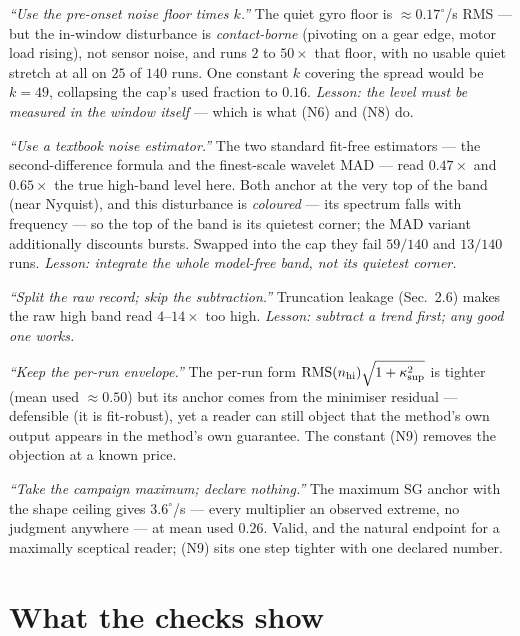 \documentclass[10pt]{article}
\newcommand{\rms}{\mathrm{RMS}}
\begin{document}
\emph{``Use the pre-onset noise floor times $k$.''} The quiet gyro
floor is $\approx 0.17^\circ$/s RMS --- but the in-window disturbance
is \emph{contact-borne} (pivoting on a gear edge, motor load rising),
not sensor noise, and runs $2$ to $50\times$ that floor, with no
usable quiet stretch at all on $25$ of $140$ runs. One constant $k$
covering the spread would be $k = 49$, collapsing the cap's used
fraction to $0.16$. \emph{Lesson: the level must be measured in the
window itself} --- which is what (N6) and (N8) do.

\emph{``Use a textbook noise estimator.''} The two standard fit-free
estimators --- the second-difference formula and the finest-scale
wavelet MAD --- read $0.47\times$ and $0.65\times$ the true high-band
level here. Both anchor at the very top of the band (near Nyquist),
and this disturbance is \emph{coloured} --- its spectrum falls with
frequency --- so the top of the band is its quietest corner; the MAD
variant additionally discounts bursts. Swapped into the cap they fail
$59/140$ and $13/140$ runs. \emph{Lesson: integrate the whole
model-free band, not its quietest corner.}

\emph{``Split the raw record; skip the subtraction.''} Truncation
leakage (Sec.~2.6) makes the raw high band read $4$--$14\times$ too
high. \emph{Lesson: subtract a trend first; any good one works.}

\emph{``Keep the per-run envelope.''} The per-run form
$\rms(n_{\rm hi})\sqrt{1+\kappa_{\sup}^2}$ is tighter (mean used
$\approx 0.50$) but its anchor comes from the minimiser residual ---
defensible (it is fit-robust), yet a reader can still object that the
method's own output appears in the method's own guarantee. The
constant (N9) removes the objection at a known price.

\emph{``Take the campaign maximum; declare nothing.''} The maximum SG
anchor with the shape ceiling gives $3.6^\circ$/s --- every
multiplier an observed extreme, no judgment anywhere --- at mean used
$0.26$. Valid, and the natural endpoint for a maximally sceptical
reader; (N9) sits one step tighter with one declared number.

\section{What the checks show}
\end{document}

